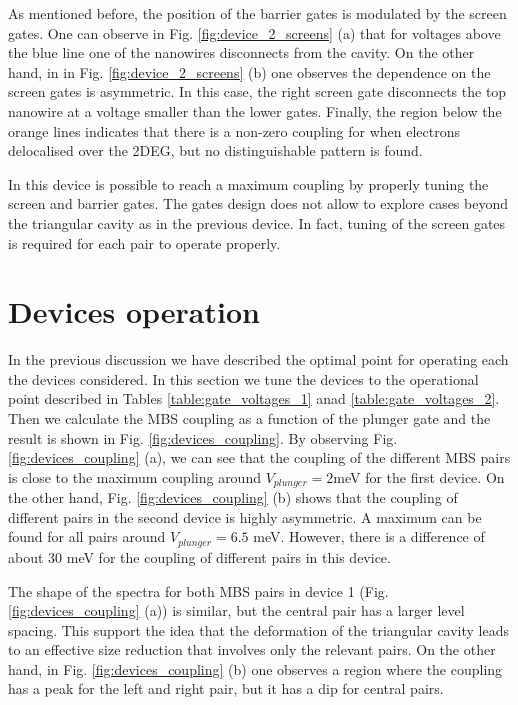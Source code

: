 As mentioned before, the position of the barrier gates is modulated by the screen gates.
One can observe in Fig. \ref{fig:device_2_screens} (a) that for voltages above the blue line one of the nanowires disconnects from the cavity.
On the other hand, in in Fig. \ref{fig:device_2_screens} (b) one observes the dependence on the screen gates is asymmetric.
In this case, the right screen gate disconnects the top nanowire at a voltage smaller than the lower gates.
Finally, the region below the orange lines indicates that there is a non-zero coupling for when electrons delocalised over the 2DEG, but no distinguishable pattern is found.

In this device is possible to reach a maximum coupling by properly tuning the screen and barrier gates.
The gates design does not allow to explore cases beyond the triangular cavity as in the previous device.
In fact, tuning of the screen gates is required for each pair to operate properly.

\section{Devices operation}

In the previous discussion we have described the optimal point for operating each the devices considered.
In this section we tune the devices to the operational point described in Tables \ref{table:gate_voltages_1} anad \ref{table:gate_voltages_2}.
Then we calculate the MBS coupling as a function of the plunger gate and the result is shown in Fig. \ref{fig:devices_coupling}.
By observing Fig. \ref{fig:devices_coupling} (a), we can see that the coupling of the different MBS pairs is close to the maximum coupling around $V_{plunger}=2$meV for the first device.
On the other hand, Fig. \ref{fig:devices_coupling} (b) shows that the coupling of different pairs in the second device is highly asymmetric.
A maximum can be found for all pairs around $V_{plunger} = 6.5$ meV.
However, there is a difference of about $30$ meV for the coupling of different pairs in this device.

The shape of the spectra for both MBS pairs in device 1 (Fig. \ref{fig:devices_coupling} (a)) is similar, but the central pair has a larger level spacing.
This support the idea that the deformation of the triangular cavity leads to an effective size reduction that involves only the relevant pairs.
On the other hand, in Fig. \ref{fig:devices_coupling} (b) one observes a region where the coupling has a peak for the left and right pair, but it has a dip for central pairs.

